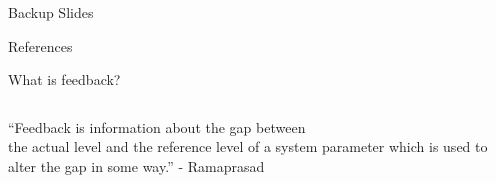 \documentclass[10pt]{beamer}
\begin{document}
{ %
    \begin{frame}[plain]
     \end{frame}
}

\begin{frame}[standout]
  Backup Slides
\end{frame}

\appendix

\begin{frame}[allowframebreaks]{References}
  
  
\end{frame}

\begin{frame}[fragile]{What is feedback?}
  \begin{columns}[T]
    \begin{column}{.8\textwidth}
      \begin{block}{}
        ``Feedback is information about the gap between\\ the actual level and the reference level of a system parameter which is used to alter the gap in some way.'' - Ramaprasad~\cite{Ramaprasad1983}
      \end{block}
    \end{column}
  \end{columns}
\end{frame}
\end{document}
